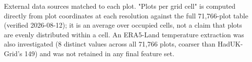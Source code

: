 \begin{table}[!htbp]
\centering
{}
\caption{External data sources matched to each plot. "Plots per grid cell" is computed directly
from plot coordinates at each resolution against the full 71,766-plot table (verified 2026-08-12);
it is an average over occupied cells, not a claim that plots are evenly distributed within a cell.
An ERA5-Land temperature extraction was also investigated (8 distinct values across all 71,766
plots, coarser than HadUK-Grid's 149) and was not retained in any final feature set.}
\label{tab:data-env-sources}
\end{table}

